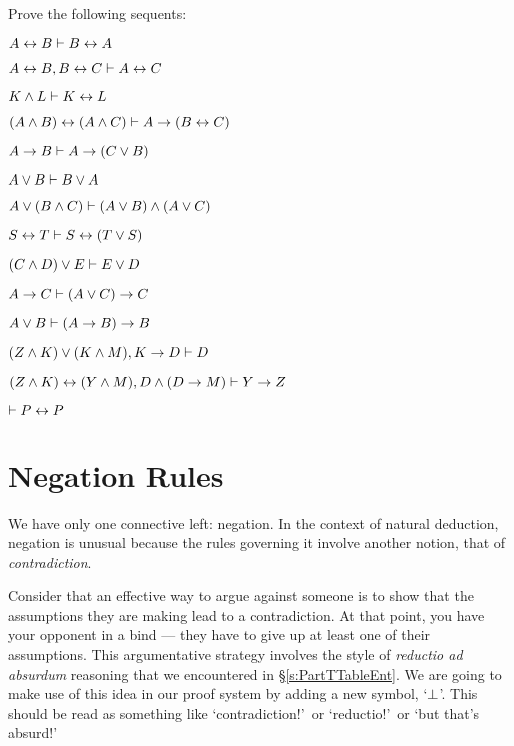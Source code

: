 \practiceproblems

\problempart
Prove the following sequents:

\begin{earg}
\item $A \leftrightarrow B \vdash B \leftrightarrow A$
\item $A\leftrightarrow B, B\leftrightarrow C \vdash A\leftrightarrow C$
\item $K \wedge L \vdash K \leftrightarrow L$
\item $(A \wedge B) \leftrightarrow (A \wedge C) \vdash A \rightarrow (B \leftrightarrow C)$
\item $A \rightarrow B \vdash A \rightarrow (C \vee B)$
\item $A \vee B \vdash B \vee A$
\item $A \vee (B \wedge C) \vdash (A \vee B) \wedge (A \vee C)$
\item $S\leftrightarrow T \vdash S\leftrightarrow (T\vee S)$
\item $(C\wedge D)\vee E \vdash E\vee D$
\item $A \rightarrow C \vdash (A \vee C) \rightarrow C$
\item $A \vee B \vdash (A \rightarrow B) \rightarrow B$
\item $(Z\wedge K) \vee (K\wedge M), K \rightarrow D \vdash D$
\item $(Z\wedge K)\leftrightarrow(Y\wedge M), D\wedge(D\rightarrow M) \vdash Y\rightarrow Z$
\item $\vdash P \leftrightarrow P$


\end{earg}



\section{Negation Rules}



We have only one connective left: negation. In the context of natural deduction, negation is unusual because the rules governing it involve another notion, that of  \emph{contradiction}. 

Consider that an effective way to argue against someone is to show that the assumptions they are making lead to a contradiction.  At that point, you have your opponent in a bind --- they have to give up at least one of their assumptions. This argumentative strategy involves the style of \emph{reductio ad absurdum} reasoning that we encountered in \S\ref{s:PartTTableEnt}.  We are going to make use of this idea in our proof system by adding a new symbol, `$\bot$'.  This should be read as something like `contradiction!'\ or `reductio!'\ or `but that's absurd!'  

